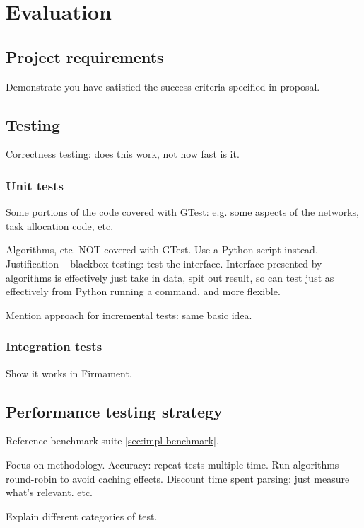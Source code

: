 \chapter{Evaluation} \label{chap:eval}

\section{Project requirements} 

Demonstrate you have satisfied the success criteria specified in proposal.

\section{Testing}

Correctness testing: does this work, not how fast is it.

\subsection{Unit tests}
Some portions of the code covered with GTest: e.g. some aspects of the networks, task allocation code, etc. 

Algorithms, etc. NOT covered with GTest. Use a Python script instead. Justification -- blackbox testing: test the interface. Interface presented by algorithms is effectively just take in data, spit out result, so can test just as effectively from Python running a command, and more flexible.

Mention approach for incremental tests: same basic idea.

\subsection{Integration tests}

Show it works in Firmament.

\section{Performance testing strategy}

Reference benchmark suite \ref{sec:impl-benchmark}. 

Focus on methodology. Accuracy: repeat tests multiple time. Run algorithms round-robin to avoid caching effects. Discount time spent parsing: just measure what's relevant. etc.

Explain different categories of test.

